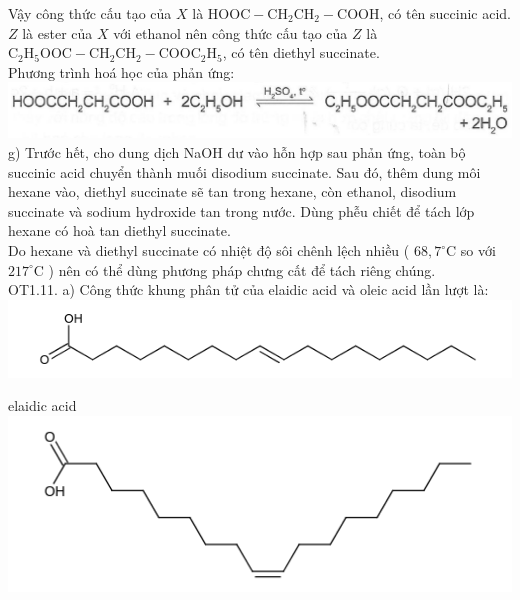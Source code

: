\documentclass[10pt]{article}
\begin{document}
Vậy công thức cấu tạo của $X$ là $\mathrm{HOOC}-\mathrm{CH}_{2} \mathrm{CH}_{2}-\mathrm{COOH}$, có tên succinic acid.\\
$Z$ là ester của $X$ với ethanol nên công thức cấu tạo của $Z$ là $\mathrm{C}_{2} \mathrm{H}_{5} \mathrm{OOC}-\mathrm{CH}_{2} \mathrm{CH}_{2}-\mathrm{COOC}_{2} \mathrm{H}_{5}$, có tên diethyl succinate.\\
Phương trình hoá học của phản ứng:\\
\includegraphics[max width=\textwidth, center]{2025_10_23_b4e16b74380d0f7e7700g-015}\\
g) Trước hết, cho dung dịch NaOH dư vào hỗn hợp sau phản ứng, toàn bộ succinic acid chuyển thành muối disodium succinate. Sau đó, thêm dung môi hexane vào, diethyl succinate sẽ tan trong hexane, còn ethanol, disodium succinate và sodium hydroxide tan trong nước. Dùng phễu chiết để tách lớp hexane có hoà tan diethyl succinate.\\
Do hexane và diethyl succinate có nhiệt độ sôi chênh lệch nhiều ( $68,7^{\circ} \mathrm{C}$ so với $217^{\circ} \mathrm{C}$ ) nên có thể dùng phương pháp chưng cất để tách riêng chúng.\\
OT1.11. a) Công thức khung phân tử của elaidic acid và oleic acid lần lượt là:\\
\includegraphics{smile-22696f0883bb4885950955b0f3baa2636607dbfa}

elaidic acid\\
\includegraphics{smile-bd02b89272428b67383050cd4a9dcf0ee552f838}
\end{document}
